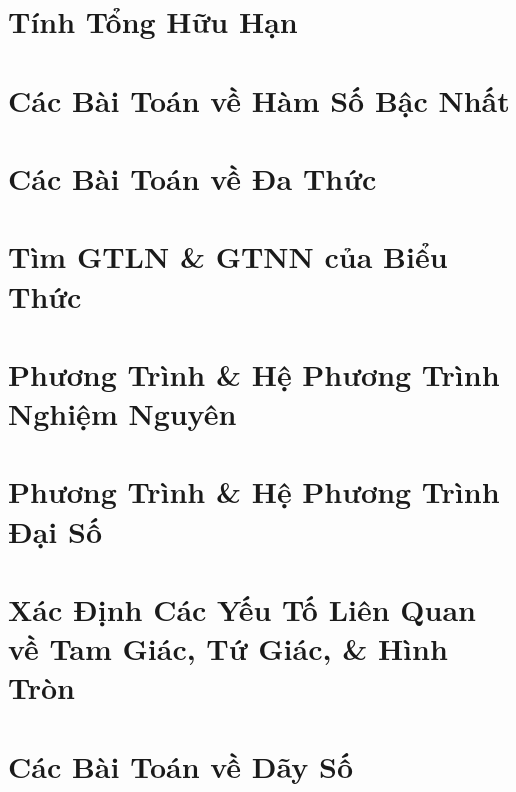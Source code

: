 \documentclass{article}
\begin{document}
\section{Tính Tổng Hữu Hạn}


\section{Các Bài Toán về Hàm Số Bậc Nhất}


\section{Các Bài Toán về Đa Thức}


\section{Tìm GTLN \& GTNN của Biểu Thức}


\section{Phương Trình \& Hệ Phương Trình Nghiệm Nguyên}


\section{Phương Trình \& Hệ Phương Trình Đại Số}


\section{Xác Định Các Yếu Tố Liên Quan về Tam Giác, Tứ Giác, \& Hình Tròn}


\section{Các Bài Toán về Dãy Số}
\end{document}
